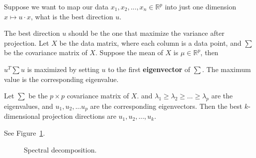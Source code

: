  Suppose we want to map our data $x_1, x_2, ..., x_n \in 
\mathbb{R}^p$ into just one dimension $x \mapsto u \cdot x$, what is the best direction $u$.

The best direction $u$ should be the one that maximize the variance after projection. Let $X$
be the data matrix, where each column is a data point, and $\sum$ be the covariance matrix of $X$. 
Suppose the mean of $X$ is $\mu \in \mathbb{R}^p$, then 

\begin{remark}
	$u^T\sum u$ is maximized by setting $u$ to the first \textbf{eigenvector} of $\sum$. The maximum
	value is the corresponding eigenvalue.
\end{remark}


 Let $\sum$ be the $p\times p$ covariance matrix of $X$. 
and $\lambda_1 \geq  \lambda_2 \geq ... \geq \lambda_p$ are the eigenvalues, and $u_1, u_2, ...
u_p$ are the corresponding eigenvectors. Then the best $k$-dimensional projection directions are
$u_1, u_2, ..., u_k$.


 See Figure~\ref{fig:spec_decomp_mar}.
\begin{figure}[H]
	\caption{Spectral decomposition.}
	\label{fig:spec_decomp_mar}
\end{figure}

